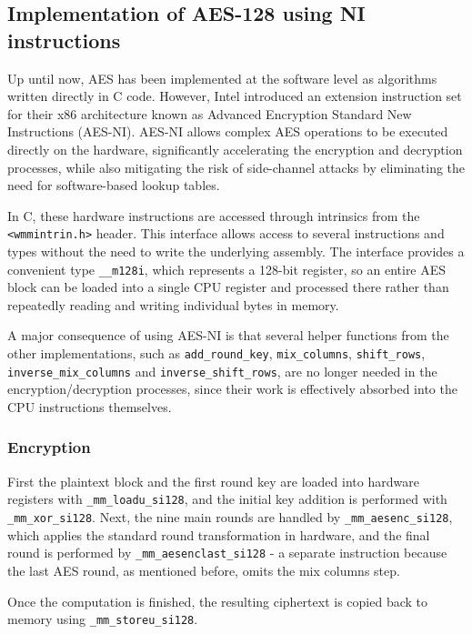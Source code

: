 \subsection{Implementation of AES-128 using NI instructions}

Up until now, AES has been implemented at the software level as algorithms written directly in C code. However, Intel introduced an extension instruction set for their x86 architecture known as Advanced Encryption Standard New Instructions (AES-NI). AES-NI allows complex AES operations to be executed directly on the hardware, significantly accelerating the encryption and decryption processes, while also mitigating the risk of side-channel attacks by eliminating the need for software-based lookup tables.

In C, these hardware instructions are accessed through intrinsics from the \texttt{\textless wmmintrin.h\textgreater} header. This interface allows access to several instructions and types without the need to write the underlying assembly. The interface provides a convenient type \texttt{\_\_m128i}, which represents a 128-bit register, so an entire AES block can be loaded into a single CPU register and processed there rather than repeatedly reading and writing individual bytes in memory.

A major consequence of using AES-NI is that several helper functions from the other implementations, such as \texttt{add\_round\_key}, \texttt{mix\_columns}, \texttt{shift\_rows}, \texttt{inverse\_mix\_columns} and \texttt{inverse\_shift\_rows}, are no longer needed in the encryption/decryption processes, since their work is effectively absorbed into the CPU instructions themselves.

\subsubsection{Encryption}

First the plaintext block and the first round key are loaded into hardware registers with \texttt{\_mm\_loadu\_si128}, and the initial key addition is performed with \texttt{\_mm\_xor\_si128}. Next, the nine main rounds are handled by \texttt{\_mm\_aesenc\_si128}, which applies the standard round transformation in hardware, and the final round is performed by \texttt{\_mm\_aesenclast\_si128} - a separate instruction because the last AES round, as mentioned before, omits the mix columns step.

Once the computation is finished, the resulting ciphertext is copied back to memory using \texttt{\_mm\_storeu\_si128}.

